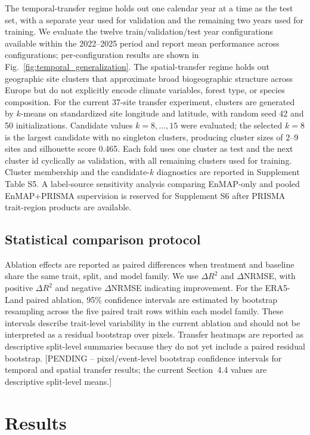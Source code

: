 \documentclass[final,times,onecolumn, authoryear]{elsarticle}
\begin{document}
\begin{linenumbers}
The temporal-transfer regime holds out one calendar year at a time as the test set, with a separate year used for validation and the remaining two years used for training. We evaluate the twelve train/validation/test year configurations available within the 2022--2025 period and report mean performance across configurations; per-configuration results are shown in Fig.~\ref{fig:temporal_generalization}. The spatial-transfer regime holds out geographic site clusters that approximate broad biogeographic structure across Europe but do not explicitly encode climate variables, forest type, or species composition. For the current 37-site transfer experiment, clusters are generated by $k$-means on standardized site longitude and latitude, with random seed 42 and 50 initializations. Candidate values $k=8,\ldots,15$ were evaluated; the selected $k=8$ is the largest candidate with no singleton clusters, producing cluster sizes of 2--9 sites and silhouette score 0.465. Each fold uses one cluster as test and the next cluster id cyclically as validation, with all remaining clusters used for training. Cluster membership and the candidate-$k$ diagnostics are reported in Supplement Table S5. A label-source sensitivity analysis comparing EnMAP-only and pooled EnMAP+PRISMA supervision is reserved for Supplement S6 after PRISMA trait-region products are available.

\subsection{Statistical comparison protocol}

Ablation effects are reported as paired differences when treatment and baseline share the same trait, split, and model family. We use $\Delta R^2$ and $\Delta$NRMSE, with positive $\Delta R^2$ and negative $\Delta$NRMSE indicating improvement. For the ERA5-Land paired ablation, 95\% confidence intervals are estimated by bootstrap resampling across the five paired trait rows within each model family. These intervals describe trait-level variability in the current ablation and should not be interpreted as a residual bootstrap over pixels. Transfer heatmaps are reported as descriptive split-level summaries because they do not yet include a paired residual bootstrap. [PENDING -- pixel/event-level bootstrap confidence intervals for temporal and spatial transfer results; the current Section~4.4 values are descriptive split-level means.]

\section{Results}


\end{linenumbers}
\end{document}
